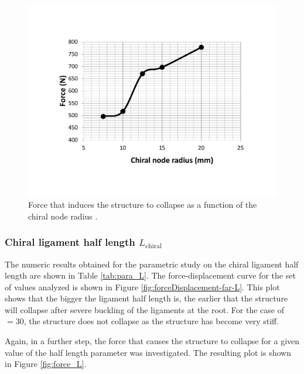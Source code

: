       \begin{figure}[!htpb] %
        \centering
        \includegraphics[width=0.8 \textwidth]{../figures/result-sim/r/force_r}
        \caption[Force that induces the structure to collapse as a function of the chiral node depth]{Force that induces the structure to collapse as a function of the chiral node radius \chir.}\label{fig:force_r}
      \end{figure}

    \clearpage
    \subsubsection{Chiral ligament half length $L_{\mathrm{chiral}}$}

      The numeric results obtained for the parametric study on the chiral ligament half length \chiL are shown in Table \ref{tab:para_L}. The force-displacement curve for the set of values analyzed is shown in Figure \ref{fig:forceDisplacement-far-L}. This plot shows that the bigger the ligament half length is, the earlier that the structure will collapse after severe buckling of the ligaments at the root. For the case of \chiL$= 30$, the structure does not collapse as the structure has become very stiff.

      Again, in a further step, the force that causes the structure to collapse for a given value of the half length \chiL parameter was investigated. The resulting plot is shown in Figure \ref{fig:force_L}.

